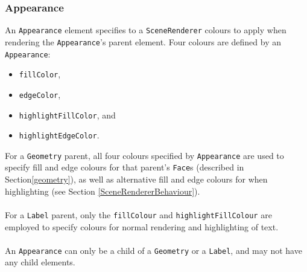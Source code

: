 \documentclass[10pt,aps, prb,preprint]{article}
\begin{document}


\subsubsection{Appearance}
\label{appearance}

An \texttt{Appearance} element specifies to a \texttt{SceneRenderer} colours to apply when rendering the \texttt{Appearance}'s parent element. Four colours are defined by an \texttt{Appearance}:
\begin{itemize}
\item \texttt{fillColor},
\item \texttt{edgeColor},
\item \texttt{highlightFillColor}, and
\item \texttt{highlightEdgeColor}.
\end{itemize}
For a \texttt{Geometry} parent, all four colours specified by \texttt{Appearance} are used to specify fill and edge colours for that parent's \texttt{Face}s  (described in Section\ref{geometry}), as well as alternative fill and edge colours for when highlighting (see Section \ref{SceneRendererBehaviour}).
\\
\\
For a \texttt{Label} parent, only the \texttt{fillColour} and \texttt{highlightFillColour} are employed to specify colours for normal rendering and highlighting of text.
\\
\\
An \texttt{Appearance} can only be a child of a \texttt{Geometry} or a \texttt{Label}, and may not have any child elements.


\end{document}
